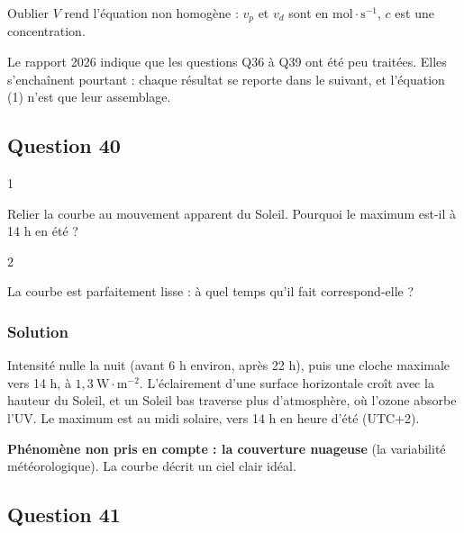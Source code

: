 \documentclass[11pt,a4paper]{article}
\begin{document}
\begin{piege}

Oublier \(V\) rend l'équation non homogène : \(v_p\) et \(v_d\) sont en \(\mathrm{mol\cdot s^{-1}}\), \(c\) est une concentration.

\end{piege}

\begin{jury}

Le rapport 2026 indique que les questions Q36 à Q39 ont été peu traitées. Elles s'enchaînent pourtant : chaque résultat se reporte dans le suivant, et l'équation (1) n'est que leur assemblage.

\end{jury}

\hypertarget{question-40}{%
\subsection{Question 40}\label{question-40}}

\begin{indication}{1}

Relier la courbe au mouvement apparent du Soleil. Pourquoi le maximum est-il à 14 h en été ?

\end{indication}

\begin{indication}{2}

La courbe est parfaitement lisse : à quel temps qu'il fait correspond-elle ?

\end{indication}

\hypertarget{solution-39}{%
\subsubsection{Solution}\label{solution-39}}

Intensité nulle la nuit (avant 6 h environ, après 22 h), puis une cloche maximale vers 14 h, à \(1{,}3\ \mathrm{W\cdot m^{-2}}\). L'éclairement d'une surface horizontale croît avec la hauteur du Soleil, et un Soleil bas traverse plus d'atmosphère, où l'ozone absorbe l'UV. Le maximum est au midi solaire, vers 14 h en heure d'été (UTC+2).

\textbf{Phénomène non pris en compte : la couverture nuageuse} (la variabilité météorologique). La courbe décrit un ciel clair idéal.

\hypertarget{question-41}{%
\subsection{Question 41}\label{question-41}}
\end{document}
